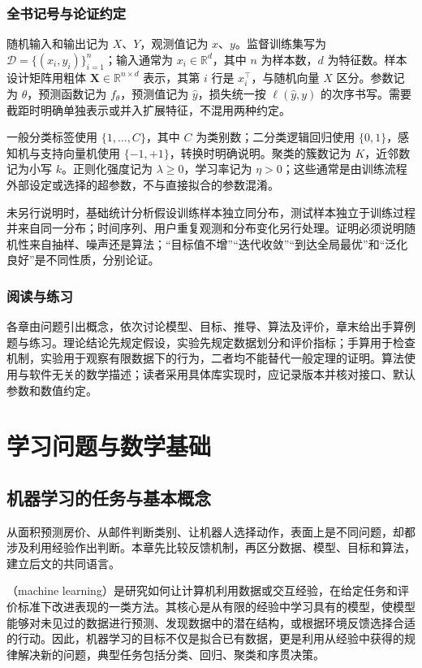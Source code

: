 \documentclass[UTF8,12pt,a4paper,fontset=fandol]{ctexbook}
\begin{document}
\section*{全书记号与论证约定}

随机输入和输出记为 $X$、$Y$，观测值记为 $x$、$y$。监督训练集写为 $\mathcal D=\{(x_i,y_i)\}_{i=1}^{n}$；输入通常为 $x_i\in\mathbb R^d$，其中 $n$ 为样本数，$d$ 为特征数。样本设计矩阵用粗体 $\mathbf X\in\mathbb R^{n\times d}$ 表示，其第 $i$ 行是 $x_i^\top$，与随机向量 $X$ 区分。参数记为 $\theta$，预测函数记为 $f_\theta$，预测值记为 $\widehat y$，损失统一按 $\ell(\widehat y,y)$ 的次序书写。需要截距时明确单独表示或并入扩展特征，不混用两种约定。

一般分类标签使用 $\{1,\ldots,C\}$，其中 $C$ 为类别数；二分类逻辑回归使用 $\{0,1\}$，感知机与支持向量机使用 $\{-1,+1\}$，转换时明确说明。聚类的簇数记为 $K$，近邻数记为小写 $k$。正则化强度记为 $\lambda\geq0$，学习率记为 $\eta>0$；这些通常是由训练流程外部设定或选择的超参数，不与直接拟合的参数混淆。

未另行说明时，基础统计分析假设训练样本独立同分布，测试样本独立于训练过程并来自同一分布；时间序列、用户重复观测和分布变化另行处理。证明必须说明随机性来自抽样、噪声还是算法；“目标值不增”“迭代收敛”“到达全局最优”和“泛化良好”是不同性质，分别论证。

\section*{阅读与练习}

各章由问题引出概念，依次讨论模型、目标、推导、算法及评价，章末给出手算例题与练习。理论结论先规定假设，实验先规定数据划分和评价指标；手算用于检查机制，实验用于观察有限数据下的行为，二者均不能替代一般定理的证明。算法使用与软件无关的数学描述；读者采用具体库实现时，应记录版本并核对接口、默认参数和数值约定。

\part{学习问题与数学基础}

\chapter{机器学习的任务与基本概念}
\label{chap:ml-tasks}

从面积预测房价、从邮件判断类别、让机器人选择动作，表面上是不同问题，却都涉及利用经验作出判断。本章先比较反馈机制，再区分数据、模型、目标和算法，建立后文的共同语言。

（machine learning）是研究如何让计算机利用数据或交互经验，在给定任务和评价标准下改进表现的一类方法。其核心是从有限的经验中学习具有的模型，使模型能够对未见过的数据进行预测、发现数据中的潜在结构，或根据环境反馈选择合适的行动。因此，机器学习的目标不仅是拟合已有数据，更是利用从经验中获得的规律解决新的问题，典型任务包括分类、回归、聚类和序贯决策。
\end{document}
